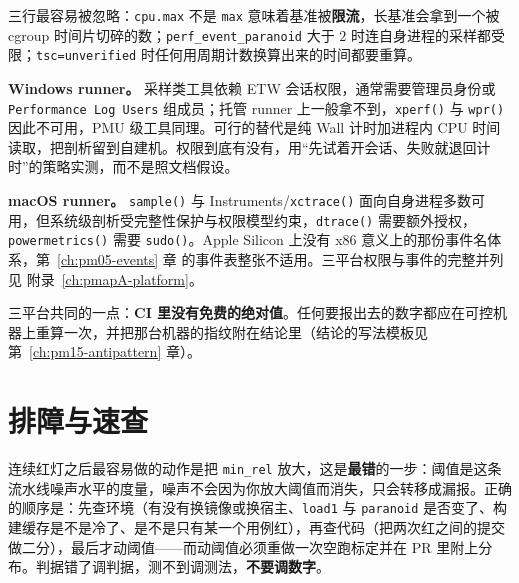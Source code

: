 \documentclass[12pt,a4paper,fontset=fandol]{ctexbook}
\newcommand{\Fn}[1]{\texttt{#1()}}
\newcommand{\Tp}[1]{\texttt{#1}}
\newcommand{\Bk}{\discretionary{}{}{}}
\newcommand{\Lang}[1]{\textsf{#1}}
\newcommand{\MWall}{\Lang{Wall}}
\begin{document}
三行最容易被忽略：\Tp{cpu.max} 不是 \Tp{max} 意味着基准被\textbf{限流}，长基准会拿到一个被 cgroup 时间片切碎的数；\Tp{perf{\Bk}\_event{\Bk}\_paranoid} 大于 $2$ 时连自身进程的采样都受限；\Tp{tsc=unverified} 时任何用周期计数换算出来的时间都要重算。

\textbf{Windows runner。} 采样类工具依赖 ETW 会话权限，通常需要管理员身份或 \Tp{Performance Log Users} 组成员；托管 runner 上一般拿不到，\Fn{xperf} 与 \Fn{wpr} 因此不可用，PMU 级工具同理。可行的替代是纯 \MWall{} 计时加进程内 CPU 时间读取，把剖析留到自建机。权限到底有没有，用``先试着开会话、失败就退回计时''的策略实测，而不是照文档假设。

\textbf{macOS runner。} \Fn{sample} 与 Instruments/\Fn{xctrace} 面向自身进程多数可用，但系统级剖析受完整性保护与权限模型约束，\Fn{dtrace} 需要额外授权，\Fn{powermetrics} 需要 \Fn{sudo}。Apple Silicon 上没有 x86 意义上的那份事件名体系，第~\ref{ch:pm05-events} 章 的事件表整张不适用。三平台权限与事件的完整并列见 附录~\ref{ch:pmapA-platform}。

三平台共同的一点：\textbf{CI 里没有免费的绝对值}。任何要报出去的数字都应在可控机器上重算一次，并把那台机器的指纹附在结论里（结论的写法模板见 第~\ref{ch:pm15-antipattern} 章）。

\section{排障与速查}
\label{sec:pm13-trouble}

\begin{warning}[title={CI 红三次就调阈值}]
\label{box:pm13-warning-threshold}
连续红灯之后最容易做的动作是把 \Tp{min\_rel} 放大，这是\textbf{最错}的一步：阈值是这条流水线噪声水平的度量，噪声不会因为你放大阈值而消失，只会转移成漏报。正确的顺序是：先查环境（有没有换镜像或换宿主、\Tp{load1} 与 \Tp{paranoid} 是否变了、构建缓存是不是冷了、是不是只有某一个用例红），再查代码（把两次红之间的提交做二分），最后才动阈值——而动阈值必须重做一次空跑标定并在 PR 里附上分布。判据错了调判据，测不到调测法，\textbf{不要调数字}。
\end{warning}
\end{document}
